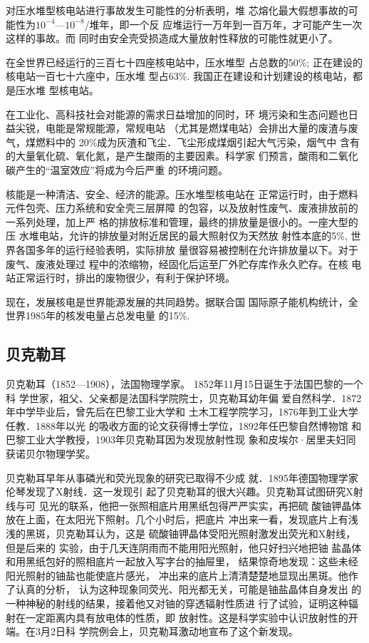 对压水堆型核电站进行事故发生可能性的分析表明，堆
芯熔化最大假想事故的可能性为$10^{-4}$—$10^{-8}$/堆年，即一个反
应堆运行一万年到一百万年，才可能产生一次这样的事故。而
同时由安全壳受损造成大量放射性释放的可能性就更小了。

在全世界已经运行的三百七十四座核电站中，压水堆型
占总数的50\%; 正在建设的核电站一百七十六座中，压水堆
型占63\%. 我国正在建设和计划建设的核电站，都是压水堆
型核电站。

在工业化、高科技社会对能源的需求日益增加的同时，环
境污染和生态问题也日益尖锐，电能是常规能源，常规电站
（尤其是燃煤电站）会排出大量的废渣与废气，煤燃料中的
20\%成为灰渣和飞尘．飞尘形成煤烟引起大气污染，烟气中
含有的大量氧化硫、氧化氮，是产生酸雨的主要因素。科学家
们预言，酸雨和二氧化碳产生的“温室效应”将成为今后严重
的环境问题。

核能是一种清洁、安全、经济的能源。压水堆型核电站在
正常运行时，由于燃料元件包壳、压力系统和安全壳三层屏障
的包容，以及放射性废气、废液排放前的一系列处理，加上严
格的排放标准和管理，最终的排放量是很小的。一座大型的压
水堆电站，允许的排放量对附近居民的最大照射仅为天然放
射性本底的5\%, 世界各国多年的运行经验表明，实际排放
量很容易被控制在允许排放量以下。对于废气、废液处理过
程中的浓缩物，经固化后运至厂外贮存库作永久贮存。在核
电站正常运行时，排出的废物很少，有利于保护环境。

现在，发展核电是世界能源发展的共同趋势。据联合国
国际原子能机构统计，全世界1985年的核发电量占总发电量
的15\%. 

\subsection{贝克勒耳}
贝克勒耳（1852—1908），法国物理学家。
1852年11月15日诞生于法国巴黎的一个科
学世家，祖父、父亲都是法国科学院院士，贝克勒耳幼年偏
爱自然科学．1872年中学毕业后，曾先后在巴黎工业大学和
土木工程学院学习，1876年到工业大学任教．1888年以光
的吸收方面的论文获得博士学位，1892年任巴黎自然博物馆
和巴黎工业大学教授，1903年贝克勒耳因为发现放射性现
象和皮埃尔·居里夫妇同获诺贝尔物理学奖。

贝克勒耳早年从事磷光和荧光现象的研究已取得不少成
就．1895年德国物理学家伦琴发现了X射线．这一发现引
起了贝克勒耳的很大兴趣。贝克勒耳试图研究X射线与可
见光的联系，他把一张照相底片用黑纸包得严严实实，再把硫
酸铀钾晶体放在上面，在太阳光下照射。几个小时后，把底片
冲出来一看，发现底片上有浅浅的黑斑，贝克勒耳认为，这是
硫酸铀钾晶体受阳光照射激发出荧光和X射线，但是后来的
实验，由于几天连阴雨而不能用阳光照射，他只好扫兴地把铀
盐晶体和用黑纸包好的照相底片一起放入写字台的抽屉里，
结果惊奇地发现：这些未经阳光照射的铀盐也能使底片感光，
冲出来的底片上清清楚楚地显现出黑斑。他作了认真的分析，
认为这种现象同荧光、阳光都无关，可能是铀盐晶体自身发出
的一种神秘的射线的结果，接着他又对铀的穿透辐射性质进
行了试验，证明这种辐射在一定距离内具有放电体的性质，即
放射性。这是科学实验中认识放射性的开端。在3月2日科
学院例会上，贝克勒耳激动地宣布了这个新发现。

